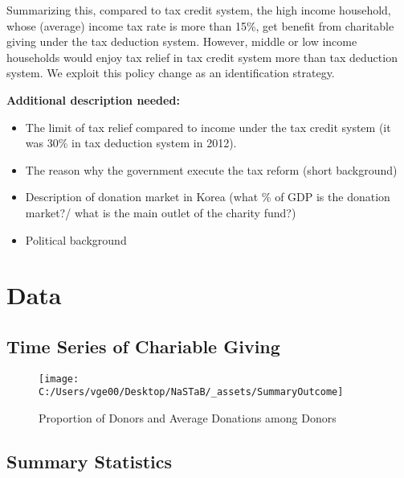 \documentclass[ review  , 3p ]{elsarticle}
\providecommand{\tightlist}{%
  \setlength{\itemsep}{0pt}\setlength{\parskip}{0pt}}
\begin{document}
  Summarizing this, compared to tax credit system, the high income household, whose (average) income tax rate is more than 15\%, get benefit from charitable giving under the tax deduction system. However, middle or low income households would enjoy tax relief in tax credit system more than tax deduction system. We exploit this policy change as an identification strategy.
  
  \textbf{Additional description needed:}
  
  \begin{itemize}
  \tightlist
  \item
    The limit of tax relief compared to income under the tax credit system (it was 30\% in tax deduction system in 2012).
  \item
    The reason why the government execute the tax reform (short background)
  \item
    Description of donation market in Korea (what \% of GDP is the donation market?/ what is the main outlet of the charity fund?)
  \item
    Political background
  \end{itemize}
  
  \hypertarget{data}{%
  \section{Data}\label{data}}
  
  \hypertarget{time-series-of-chariable-giving}{%
  \subsection{Time Series of Chariable Giving}\label{time-series-of-chariable-giving}}
  
  \begin{figure}
  
  {\centering \texttt{[image: C:/Users/vge00/Desktop/NaSTaB/\_assets/SummaryOutcome]} 
  
  }
  
  \caption{Proportion of Donors and Average Donations among Donors}\label{fig:unnamed-chunk-1}
  \end{figure}
  
  \hypertarget{summary-statistics}{%
  \subsection{Summary Statistics}\label{summary-statistics}}
  
\end{document}
